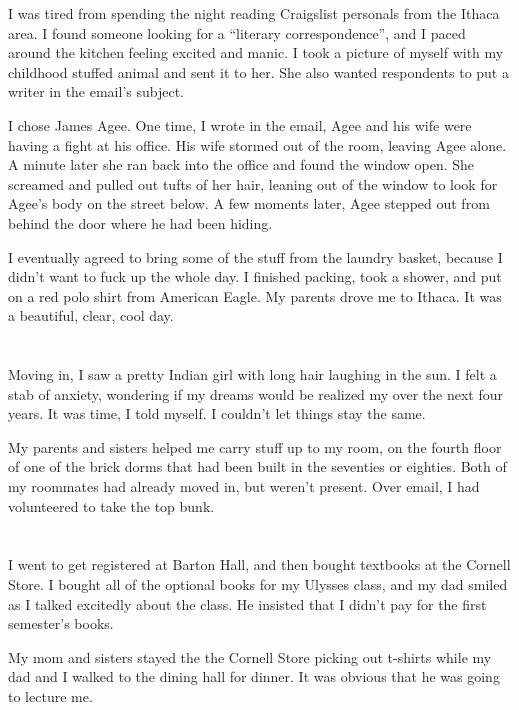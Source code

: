 I was tired from spending the night reading Craigslist personals from the Ithaca
area.  I found someone looking for a ``literary correspondence'', and I paced
around the kitchen feeling excited and manic.  I took a picture of myself with
my childhood stuffed animal and sent it to her.  She also wanted respondents to
put a writer in the email's subject.

I chose James Agee.  One time, I wrote in the email, Agee and his wife were
having a fight at his office.  His wife stormed out of the room, leaving Agee
alone.  A minute later she ran back into the office and found the window open.
She screamed and pulled out tufts of her hair, leaning out of the window to look
for Agee's body on the street below.  A few moments later, Agee stepped out from
behind the door where he had been hiding.

I eventually agreed to bring some of the stuff from the laundry basket, because
I didn't want to fuck up the whole day.  I finished packing, took a shower, and
put on a red polo shirt from American Eagle.  My parents drove me to Ithaca.  It
was a beautiful, clear, cool day.  

\section{}

Moving in, I saw a pretty Indian girl with long hair laughing in the sun.  I
felt a stab of anxiety, wondering if my dreams would be realized my over the
next four years.  It was time, I told myself.  I couldn't let things stay the
same.

My parents and sisters helped me carry stuff up to my room, on the fourth floor
of one of the brick dorms that had been built in the seventies or eighties.
Both of my roommates had already moved in, but weren't present.  Over email, I
had volunteered to take the top bunk.

\section{}

I went to get registered at Barton Hall, and then bought textbooks at the
Cornell Store.  I bought all of the optional books for my Ulysses class, and my
dad smiled as I talked excitedly about the class.  He insisted that I didn't pay
for the first semester's books.

My mom and sisters stayed the the Cornell Store picking out t-shirts while my
dad and I walked to the dining hall for dinner.  It was obvious that he was
going to lecture me.  

